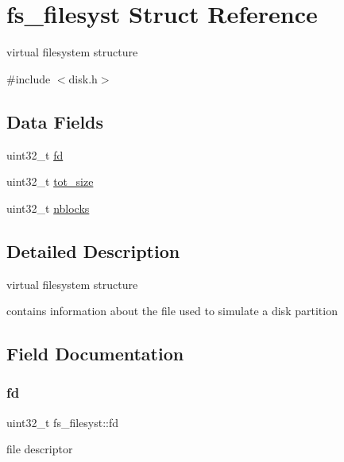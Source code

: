 \hypertarget{structfs__filesyst}{}\section{fs\+\_\+filesyst Struct Reference}
\label{structfs__filesyst}


virtual filesystem structure  




{\ttfamily \#include $<$disk.\+h$>$}

\subsection*{Data Fields}
\begin{DoxyCompactItemize}
\item 
uint32\+\_\+t \mbox{\hyperlink{structfs__filesyst_ae482ee5c2e87f81784a05bd29c8bafaa}{fd}}
\item 
uint32\+\_\+t \mbox{\hyperlink{structfs__filesyst_a5c41788f61d03bed3e6d33879e7b0e88}{tot\+\_\+size}}
\item 
uint32\+\_\+t \mbox{\hyperlink{structfs__filesyst_a8313da3a903b8e8f2d4ec3e7b0b00f7d}{nblocks}}
\end{DoxyCompactItemize}


\subsection{Detailed Description}
virtual filesystem structure 

contains information about the file used to simulate a disk partition 

\subsection{Field Documentation}
\mbox{\label{structfs__filesyst_ae482ee5c2e87f81784a05bd29c8bafaa}} 
\subsubsection{\texorpdfstring{fd}{fd}}
{\footnotesize\ttfamily uint32\+\_\+t fs\+\_\+filesyst\+::fd}

file descriptor \mbox{\label{structfs__filesyst_a8313da3a903b8e8f2d4ec3e7b0b00f7d}} 
